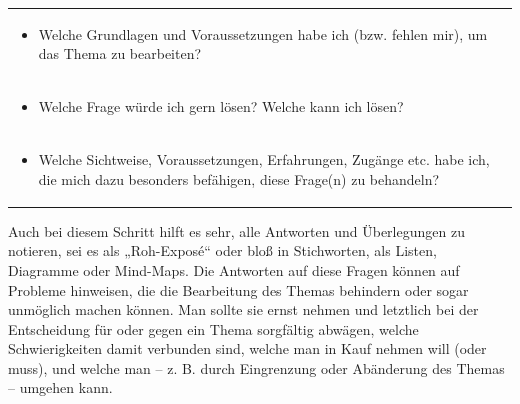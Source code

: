 \documentclass[]{book}
\providecommand{\tightlist}{%
  \setlength{\itemsep}{0pt}\setlength{\parskip}{0pt}}
\theoremstyle{definition}
\theoremstyle{definition}
\theoremstyle{definition}
\theoremstyle{remark}
\begin{document}
\begin{longtable}[]{@{}l@{}}
\begin{minipage}[t]{0.97\columnwidth}\raggedright\strut
\begin{itemize}
\tightlist
\item
  Welche Grundlagen und Voraussetzungen habe ich (bzw. fehlen mir), um
  das Thema zu bearbeiten?
\end{itemize}\strut
\end{minipage}\tabularnewline
\begin{minipage}[t]{0.97\columnwidth}\raggedright\strut
\begin{itemize}
\tightlist
\item
  Welche Frage würde ich gern lösen? Welche kann ich lösen?
\end{itemize}\strut
\end{minipage}\tabularnewline
\begin{minipage}[t]{0.97\columnwidth}\raggedright\strut
\begin{itemize}
\tightlist
\item
  Welche Sichtweise, Voraussetzungen, Erfahrungen, Zugänge etc. habe
  ich, die mich dazu besonders befähigen, diese Frage(n) zu behandeln?
\end{itemize}\strut
\end{minipage}\tabularnewline
\bottomrule
\end{longtable}

Auch bei diesem Schritt hilft es sehr, alle Antworten und Überlegungen
zu notieren, sei es als „Roh-Exposé`` oder bloß in Stichworten, als
Listen, Diagramme oder Mind-Maps. Die Antworten auf diese Fragen können
auf Probleme hinweisen, die die Bearbeitung des Themas behindern oder
sogar unmöglich machen können. Man sollte sie ernst nehmen und letztlich
bei der Entscheidung für oder gegen ein Thema sorgfältig abwägen, welche
Schwierigkeiten damit verbunden sind, welche man in Kauf nehmen will
(oder muss), und welche man -- z. B. durch Eingrenzung oder Abänderung
des Themas -- umgehen kann.
\end{document}
